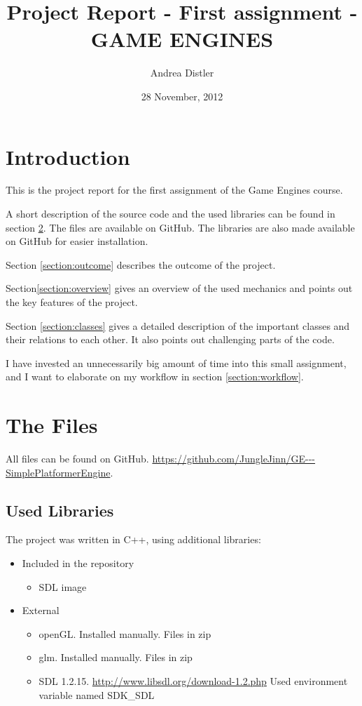 \documentclass[12pt]{article}
\title{Project Report - First assignment - GAME ENGINES}
\author{Andrea Distler}
\date{28 November, 2012}
\begin{document}
\maketitle
\newpage

\tableofcontents
\newpage

\section{Introduction}
This is the project report for the first assignment of the Game Engines course.

A short description of the source code and the used libraries can be found in section \ref{section:files}. The files are available on GitHub. The libraries are also made available on GitHub for easier installation.

Section \ref{section:outcome} describes the outcome of the project. 

Section\ref{section:overview} gives an overview of the used mechanics and points out the key features of the project. 

Section \ref{section:classes} gives a detailed description of the important classes and their relations to each other. It also points out challenging parts of the code.

I have invested an unnecessarily big amount of time into this small assignment, and I want to elaborate on my workflow in section \ref{section:workflow}.

\section{The Files}
\label{section:files}
All files can be found on GitHub. \newline 
\url{https://github.com/JungleJinn/GE---SimplePlatformerEngine}.

\subsection{Used Libraries}

The project was written in C++, using additional libraries:

\begin{itemize}
\item{
	Included in the repository
	\begin{itemize}
		\item{SDL image}
	\end{itemize}
}

\item{
	External
	\begin{itemize}
		\item{openGL. Installed manually. Files in zip}
		\item{glm. Installed manually. Files in zip}
		\item{SDL 1.2.15. \url{http://www.libsdl.org/download-1.2.php} Used environment variable named SDK\_SDL}
	\end{itemize}
}
\end{itemize}
\end{document}
